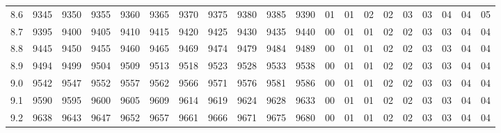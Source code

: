 \documentclass[12pt,UTF8]{ctexbook}
\begin{document}
\begin{appendix}
\begin{longtable}{|c| c c c c c | c c c c c| c c c c c c c c c|}
\scriptsize 8.6 & \scriptsize 9345 & \scriptsize 9350 & \scriptsize 9355 & \scriptsize 9360 & \scriptsize 9365 & \scriptsize 9370 & \scriptsize 9375 & \scriptsize 9380 & \scriptsize 9385 & \scriptsize 9390 & \scriptsize 01 & \scriptsize 01 & \scriptsize 02 & \scriptsize 02 & \scriptsize 03 & \scriptsize 03 & \scriptsize 04 & \scriptsize 04 & \scriptsize 05 \\
\scriptsize 8.7 & \scriptsize 9395 & \scriptsize 9400 & \scriptsize 9405 & \scriptsize 9410 & \scriptsize 9415 & \scriptsize 9420 & \scriptsize 9425 & \scriptsize 9430 & \scriptsize 9435 & \scriptsize 9440 & \scriptsize 00 & \scriptsize 01 & \scriptsize 01 & \scriptsize 02 & \scriptsize 02 & \scriptsize 03 & \scriptsize 03 & \scriptsize 04 & \scriptsize 04 \\
\scriptsize 8.8 & \scriptsize 9445 & \scriptsize 9450 & \scriptsize 9455 & \scriptsize 9460 & \scriptsize 9465 & \scriptsize 9469 & \scriptsize 9474 & \scriptsize 9479 & \scriptsize 9484 & \scriptsize 9489 & \scriptsize 00 & \scriptsize 01 & \scriptsize 01 & \scriptsize 02 & \scriptsize 02 & \scriptsize 03 & \scriptsize 03 & \scriptsize 04 & \scriptsize 04 \\
\scriptsize 8.9 & \scriptsize 9494 & \scriptsize 9499 & \scriptsize 9504 & \scriptsize 9509 & \scriptsize 9513 & \scriptsize 9518 & \scriptsize 9523 & \scriptsize 9528 & \scriptsize 9533 & \scriptsize 9538 & \scriptsize 00 & \scriptsize 01 & \scriptsize 01 & \scriptsize 02 & \scriptsize 02 & \scriptsize 03 & \scriptsize 03 & \scriptsize 04 & \scriptsize 04 \\
\scriptsize 9.0 & \scriptsize 9542 & \scriptsize 9547 & \scriptsize 9552 & \scriptsize 9557 & \scriptsize 9562 & \scriptsize 9566 & \scriptsize 9571 & \scriptsize 9576 & \scriptsize 9581 & \scriptsize 9586 & \scriptsize 00 & \scriptsize 01 & \scriptsize 01 & \scriptsize 02 & \scriptsize 02 & \scriptsize 03 & \scriptsize 03 & \scriptsize 04 & \scriptsize 04 \\
\scriptsize 9.1 & \scriptsize 9590 & \scriptsize 9595 & \scriptsize 9600 & \scriptsize 9605 & \scriptsize 9609 & \scriptsize 9614 & \scriptsize 9619 & \scriptsize 9624 & \scriptsize 9628 & \scriptsize 9633 & \scriptsize 00 & \scriptsize 01 & \scriptsize 01 & \scriptsize 02 & \scriptsize 02 & \scriptsize 03 & \scriptsize 03 & \scriptsize 04 & \scriptsize 04 \\
\scriptsize 9.2 & \scriptsize 9638 & \scriptsize 9643 & \scriptsize 9647 & \scriptsize 9652 & \scriptsize 9657 & \scriptsize 9661 & \scriptsize 9666 & \scriptsize 9671 & \scriptsize 9675 & \scriptsize 9680 & \scriptsize 00 & \scriptsize 01 & \scriptsize 01 & \scriptsize 02 & \scriptsize 02 & \scriptsize 03 & \scriptsize 03 & \scriptsize 04 & \scriptsize 04 \\

\end{longtable}
\end{appendix}
\end{document}
